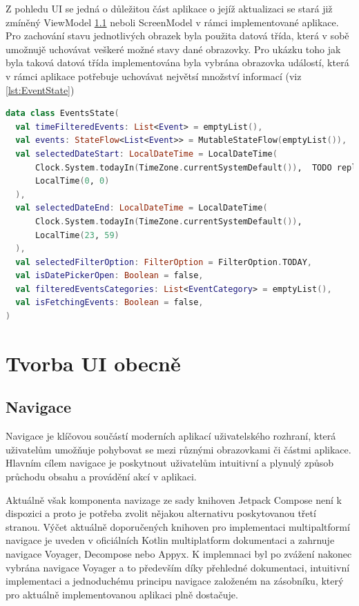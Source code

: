 Z pohledu UI se jedná o důležitou část aplikace o jejíž aktualizaci se stará již zmíněný ViewModel \ref{} neboli ScreenModel v rámci
implementované aplikace. 
Pro zachování stavu jednotlivých obrazek byla použita datová třída, která v sobě umožnujě uchovávat veškeré možné stavy dané obrazovky.
Pro ukázku toho jak byla taková datová třída implementována byla vybrána obrazovka událostí, která v rámci aplikace potřebuje 
uchovávat největsí množství informací (viz \ref{lst:EventState})

\begin{lstlisting}[caption={Event State katalog}, label={lst:EventState}, language=Kotlin]
data class EventsState(
  val timeFilteredEvents: List<Event> = emptyList(),
  val events: StateFlow<List<Event>> = MutableStateFlow(emptyList()),
  val selectedDateStart: LocalDateTime = LocalDateTime(
      Clock.System.todayIn(TimeZone.currentSystemDefault()),  TODO replace by current impl
      LocalTime(0, 0)
  ),
  val selectedDateEnd: LocalDateTime = LocalDateTime(
      Clock.System.todayIn(TimeZone.currentSystemDefault()),
      LocalTime(23, 59)
  ),
  val selectedFilterOption: FilterOption = FilterOption.TODAY,
  val isDatePickerOpen: Boolean = false,
  val filteredEventsCategories: List<EventCategory> = emptyList(),
  val isFetchingEvents: Boolean = false,
)
\end{lstlisting}

\section{Tvorba UI obecně}
\subsection{Navigace}
Navigace je klíčovou součástí moderních aplikací uživatelského rozhraní, která uživatelům umožňuje pohybovat se mezi různými obrazovkami či 
částmi aplikace. Hlavním cílem navigace je poskytnout uživatelům intuitivní a plynulý způsob průchodu obsahu a provádění akcí v aplikaci. 

Aktuálně však komponenta navizage ze sady knihoven Jetpack Compose není k dispozici a proto je potřeba zvolit nějakou alternativu poskytovanou
třetí stranou. \cite{composeNav} Výčet aktuálně doporučených knihoven pro implementaci multipaltformí navigace je uveden v oficiálních Kotlin 
multiplatform dokumentaci a zahrnuje navigace Voyager, Decompose nebo Appyx. K implemnaci byl po zvážení nakonec vybrána navigace Voyager a 
to především díky přehledné dokumentaci, intuitivní implementaci a jednoduchému principu navigace založeném na zásobníku, který pro aktuálně
implementovanou aplikaci plně dostačuje.

